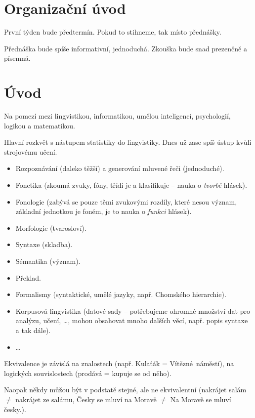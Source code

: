 \documentclass[12pt]{article}					%
\begin{document}

\section*{Organizační úvod}
\begin{poznamka}
	První týden bude předtermín. Pokud to stihneme, tak místo přednášky.

	Přednáška bude spíše informativní, jednoduchá. Zkouška bude snad prezenčně a písemná.
\end{poznamka}

\section*{Úvod}
\begin{poznamka}
	Na pomezí mezi lingvistikou, informatikou, umělou inteligencí, psychologií, logikou a matematikou.
\end{poznamka}

\begin{poznamka}[Podobory]
	Hlavní rozkvět s nástupem statistiky do lingvistiky. Dnes už zase spíš ústup kvůli strojovému učení.

	\begin{itemize}
		\item Rozpoznávání (daleko těžší) a generování mluvené řeči (jednoduché).
		\item Fonetika (zkoumá zvuky, fóny, třídí je a klasifikuje – nauka o \emph{tvorbě} hlásek).
		\item Fonologie (zabývá se pouze těmi zvukovými rozdíly, které nesou význam, základní jednotkou je foném, je to nauka o \emph{funkci} hlásek).
		\item Morfologie (tvarosloví).
		\item Syntaxe (skladba).
		\item Sémantika (význam).
		\item Překlad.
		\item Formalismy (syntaktické, umělé jazyky, např. Chomského hierarchie).
		\item Korpusová lingvistika (datové sady – potřebujeme ohromné množství dat pro analýzu, učení, …, mohou obsahovat mnoho dalších věcí, např. popis syntaxe a tak dále).
		\item …
	\end{itemize}
\end{poznamka}

\begin{poznamka}
	Ekvivalence je závislá na znalostech (např. Kulaťák = Vítězné náměstí), na logických souvislostech (prodává = kupuje se od něho).

	Naopak někdy můžou být v podstatě stejné, ale ne ekvivalentní (nakrájet salám $≠$ nakrájet ze salámu, Česky se mluví na Moravě $≠$ Na Moravě se mluví česky.).
\end{poznamka}
\end{document}
